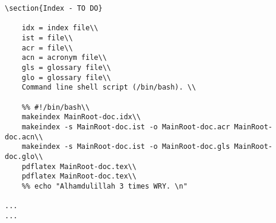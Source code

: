 \begin{tcolorbox}
\begin{lstlisting}[caption={zzAdvice-on-Indexing}, label=zzAdvice-on-Indexing]
	\section{Index - TO DO}
	
	idx = index file\\
	ist = file\\
	acr = file\\
	acn = acronym file\\
	gls = glossary file\\
	glo = glossary file\\
	Command line shell script (/bin/bash). \\
	
	%% #!/bin/bash\\
	makeindex MainRoot-doc.idx\\
	makeindex -s MainRoot-doc.ist -o MainRoot-doc.acr MainRoot-doc.acn\\
	makeindex -s MainRoot-doc.ist -o MainRoot-doc.gls MainRoot-doc.glo\\
	pdflatex MainRoot-doc.tex\\
	pdflatex MainRoot-doc.tex\\
	%% echo "Alhamdulillah 3 times WRY. \n"

...
...
\end{lstlisting}
\end{tcolorbox}
